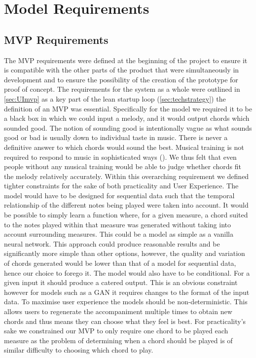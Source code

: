 \section{Model Requirements}
\label{sec:Evaluation}
\subsection{MVP Requirements}
\label{sec:MVPRequirements}
The MVP requirements were defined at the beginning of the project to ensure it is compatible with the other parts of the product that were simultaneously in development and to ensure the possibility of the creation of the prototype for proof of concept. 
The requirements for the system as a whole were outlined in \cref{sec:UImvp} as a key part of the lean startup loop (\cref{sec:techstrategy}) the definition of an MVP was essential.
Specifically for the model we required it to be a black box in which we could input a melody, and it would output chords which sounded good.
The notion of sounding good is intentionally vague as what sounds good or bad is usually down to individual taste in music.
There is never a definitive answer to which chords would sound the best.
Musical training is not required to respond to music in sophisticated ways (\cite{ExperiencedListeners}).
We thus felt that even people without any musical training would be able to judge whether chords fit the melody relatively accurately.
Within this overarching requirement we defined tighter constraints for the sake of both practicality and User Experience. 
The model would have to be designed for sequential data such that the temporal relationship of the different notes being played were taken into account.
It would be possible to simply learn a function where, for a given measure, a chord suited to the notes played within that measure was generated without taking into account surrounding measures.
This could be a model as simple as a vanilla neural network.
This approach could produce reasonable results and be significantly more simple than other options, however, the quality and variation of chords generated would be lower than that of a model for sequential data, hence our choice to forego it.
The model would also have to be conditional. For a given input it should produce a catered output. This is an obvious constraint however for models such as a GAN it requires changes to the format of the input data.
To maximise user experience the models should be non-deterministic. This allows users to regenerate the accompaniment multiple times to obtain new chords and thus means they can choose what they feel is best.
For practicality's sake we constrained our MVP to only require one chord to be played each measure as the problem of determining when a chord should be played is of similar difficulty to choosing which chord to play.

